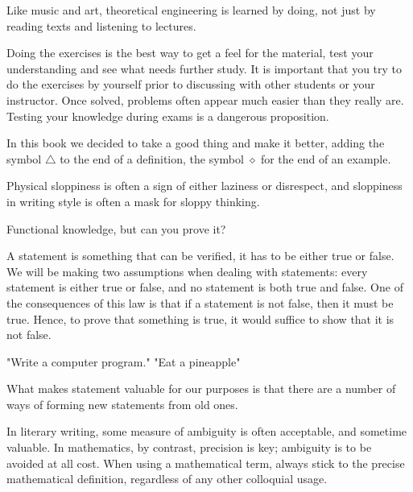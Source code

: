 Like music and art, theoretical engineering is learned by doing, not just by reading texts and listening to lectures.

Doing the exercises is the best way to get a feel for the material, test your understanding and see what needs further study.
It is important that you try to do the exercises by yourself prior to discussing with other students or your instructor.
Once solved, problems often appear much easier than they really are.
Testing your knowledge during exams is a dangerous proposition.

In this book we decided to take a good thing and make it better, adding the symbol $\triangle$ to the end of a definition, the symbol $\diamond$ for the end of an example.

Physical sloppiness is often a sign of either laziness or disrespect, and sloppiness in writing style is often a mask for sloppy thinking.


Functional knowledge,
but can you prove it?

A statement is something that can be verified, it has to be either true or false.
We will be making two assumptions when dealing with statements: every statement is either true or false, and no statement is both true and false.
One of the consequences of this law is that if a statement is not false, then it must be true.
Hence, to prove that something is true, it would suffice to show that it is not false.

"Write a computer program."
"Eat a pineapple"

What makes statement valuable for our purposes is that there are a number of ways of forming new statements from old ones.

In literary writing, some measure of ambiguity is often acceptable, and sometime valuable.
In mathematics, by contrast, precision is key; ambiguity is to be avoided at all cost.
When using a mathematical term, always stick to the precise mathematical definition, regardless of any other colloquial usage.
\fi

